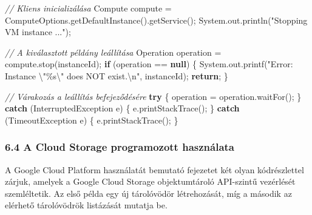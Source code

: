 \documentclass[
]{article}
\newenvironment{Shaded}{}{}
\newcommand{\BuiltInTok}[1]{\textcolor[rgb]{0.00,0.50,0.00}{#1}}
\newcommand{\CommentTok}[1]{\textcolor[rgb]{0.38,0.63,0.69}{\textit{#1}}}
\newcommand{\ControlFlowTok}[1]{\textcolor[rgb]{0.00,0.44,0.13}{\textbf{#1}}}
\newcommand{\FunctionTok}[1]{\textcolor[rgb]{0.02,0.16,0.49}{#1}}
\newcommand{\KeywordTok}[1]{\textcolor[rgb]{0.00,0.44,0.13}{\textbf{#1}}}
\newcommand{\NormalTok}[1]{#1}
\newcommand{\OperatorTok}[1]{\textcolor[rgb]{0.40,0.40,0.40}{#1}}
\newcommand{\SpecialCharTok}[1]{\textcolor[rgb]{0.25,0.44,0.63}{#1}}
\newcommand{\StringTok}[1]{\textcolor[rgb]{0.25,0.44,0.63}{#1}}
\begin{document}
\begin{Shaded}
\begin{Highlighting}[]
\CommentTok{// Kliens inicializálása}
\NormalTok{Compute compute }\OperatorTok{=}\NormalTok{ ComputeOptions}\OperatorTok{.}\FunctionTok{getDefaultInstance}\OperatorTok{().}\FunctionTok{getService}\OperatorTok{();}
\BuiltInTok{System}\OperatorTok{.}\FunctionTok{out}\OperatorTok{.}\FunctionTok{println}\OperatorTok{(}\StringTok{"Stopping VM instance ..."}\OperatorTok{);}

\CommentTok{// A kiválasztott példány leállítása}
\BuiltInTok{Operation}\NormalTok{ operation }\OperatorTok{=}\NormalTok{ compute}\OperatorTok{.}\FunctionTok{stop}\OperatorTok{(}\NormalTok{instanceId}\OperatorTok{);}
\ControlFlowTok{if} \OperatorTok{(}\NormalTok{operation }\OperatorTok{==} \KeywordTok{null}\OperatorTok{)} \OperatorTok{\{}
   \BuiltInTok{System}\OperatorTok{.}\FunctionTok{out}\OperatorTok{.}\FunctionTok{printf}\OperatorTok{(}\StringTok{"Error: Instance }\SpecialCharTok{\textbackslash{}"\%s\textbackslash{}"}\StringTok{ does NOT exist.}\SpecialCharTok{\textbackslash{}n}\StringTok{"}\OperatorTok{,}\NormalTok{ instanceId}\OperatorTok{);}
   \ControlFlowTok{return}\OperatorTok{;}
\OperatorTok{\}}

\CommentTok{// Várakozás a leállítás befejeződésére}
\ControlFlowTok{try} \OperatorTok{\{}
\NormalTok{    operation }\OperatorTok{=}\NormalTok{ operation}\OperatorTok{.}\FunctionTok{waitFor}\OperatorTok{();}
\OperatorTok{\}} \ControlFlowTok{catch} \OperatorTok{(}\BuiltInTok{InterruptedException}\NormalTok{ e}\OperatorTok{)} \OperatorTok{\{}
\NormalTok{    e}\OperatorTok{.}\FunctionTok{printStackTrace}\OperatorTok{();}
\OperatorTok{\}} \ControlFlowTok{catch} \OperatorTok{(}\BuiltInTok{TimeoutException}\NormalTok{ e}\OperatorTok{)} \OperatorTok{\{}
\NormalTok{    e}\OperatorTok{.}\FunctionTok{printStackTrace}\OperatorTok{();}
\OperatorTok{\}}
\end{Highlighting}
\end{Shaded}

\hypertarget{a-cloud-storage-programozott-hasznuxe1lata}{%
\subsubsection{6.4 A Cloud Storage programozott
használata}\label{a-cloud-storage-programozott-hasznuxe1lata}}

A Google Cloud Platform használatát bemutató fejezetet két olyan
kódrészlettel zárjuk, amelyek a Google Cloud Storage objektumtároló
API-szintű vezérlését szemléltetik. Az első példa egy új tárolóvödör
létrehozását, míg a második az elérhető tárolóvödrök listázását mutatja
be.
\end{document}
